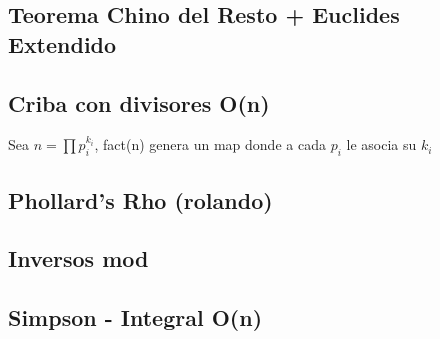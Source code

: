 \subsection{Teorema Chino del Resto + Euclides Extendido}
\subsection{Criba con divisores O(n)}
Sea $n=\prod{p_i^{k_i}}$, fact(n) genera un map donde a cada $p_i$ le asocia su $k_i$
\subsection{Phollard's Rho (rolando)} %
\subsection{Inversos mod}
\subsection{Simpson - Integral O(n)}
